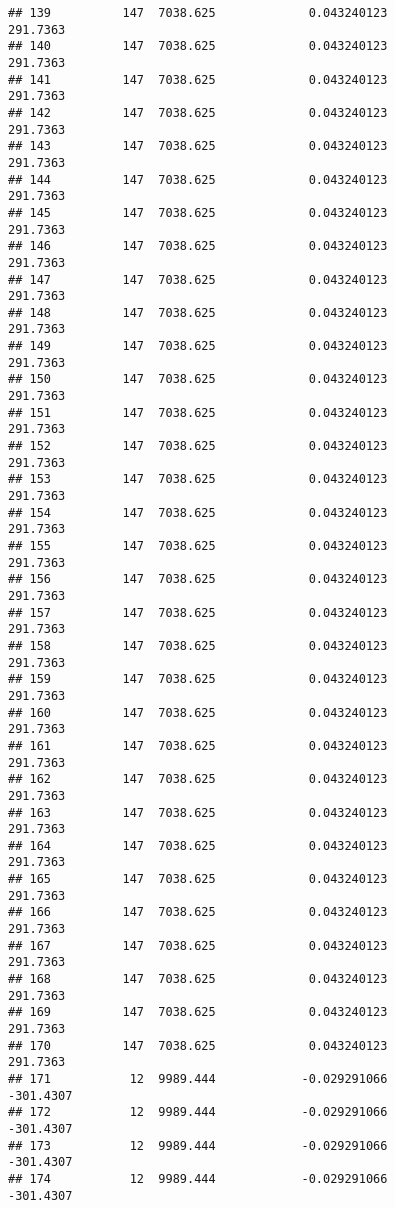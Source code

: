 \documentclass[]{article}
\begin{document}
\begin{verbatim}
## 139          147  7038.625             0.043240123           291.7363
## 140          147  7038.625             0.043240123           291.7363
## 141          147  7038.625             0.043240123           291.7363
## 142          147  7038.625             0.043240123           291.7363
## 143          147  7038.625             0.043240123           291.7363
## 144          147  7038.625             0.043240123           291.7363
## 145          147  7038.625             0.043240123           291.7363
## 146          147  7038.625             0.043240123           291.7363
## 147          147  7038.625             0.043240123           291.7363
## 148          147  7038.625             0.043240123           291.7363
## 149          147  7038.625             0.043240123           291.7363
## 150          147  7038.625             0.043240123           291.7363
## 151          147  7038.625             0.043240123           291.7363
## 152          147  7038.625             0.043240123           291.7363
## 153          147  7038.625             0.043240123           291.7363
## 154          147  7038.625             0.043240123           291.7363
## 155          147  7038.625             0.043240123           291.7363
## 156          147  7038.625             0.043240123           291.7363
## 157          147  7038.625             0.043240123           291.7363
## 158          147  7038.625             0.043240123           291.7363
## 159          147  7038.625             0.043240123           291.7363
## 160          147  7038.625             0.043240123           291.7363
## 161          147  7038.625             0.043240123           291.7363
## 162          147  7038.625             0.043240123           291.7363
## 163          147  7038.625             0.043240123           291.7363
## 164          147  7038.625             0.043240123           291.7363
## 165          147  7038.625             0.043240123           291.7363
## 166          147  7038.625             0.043240123           291.7363
## 167          147  7038.625             0.043240123           291.7363
## 168          147  7038.625             0.043240123           291.7363
## 169          147  7038.625             0.043240123           291.7363
## 170          147  7038.625             0.043240123           291.7363
## 171           12  9989.444            -0.029291066          -301.4307
## 172           12  9989.444            -0.029291066          -301.4307
## 173           12  9989.444            -0.029291066          -301.4307
## 174           12  9989.444            -0.029291066          -301.4307

\end{verbatim}
\end{document}

